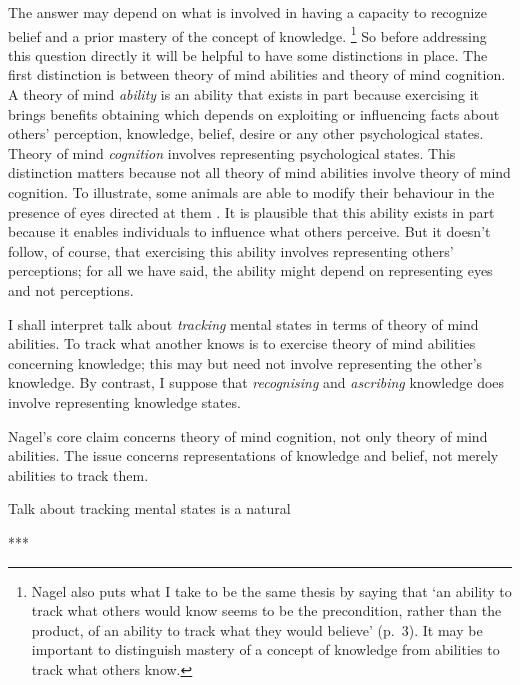 \documentclass[11pt,a4paper]{extarticle}
\begin{document}
The answer may depend on what is involved in having a capacity  to recognize belief and a prior mastery of the concept of knowledge.%
\footnote{
Nagel also puts what I take to be the same thesis by saying that `an ability to track what others would know seems to be the precondition, rather than the product, of an ability to track what they would believe' (p.\ 3).
It may be important to distinguish mastery of a concept of knowledge from abilities to track what others know.
}
So before addressing this question directly it will be helpful to have some distinctions in place.
The first distinction is between theory of mind abilities and theory of mind cognition.
A theory of mind \textit{ability} is an ability that exists in part because exercising it brings benefits obtaining which depends on exploiting or influencing facts about others’ perception, knowledge, belief, desire or any other psychological states.  
Theory of mind \textit{cognition}  involves representing psychological states.
This distinction matters because not all theory of mind abilities involve theory of mind cognition.
To illustrate, some animals are able to modify their behaviour  in the presence of eyes directed at them \citep[e.g.][]{ernest-jones_effects_2011}.
It is plausible that this ability exists in part because it enables individuals to influence what others perceive.
But it doesn't follow, of course, that exercising this ability involves representing others' perceptions; for all we have said, the ability might depend on representing eyes and not perceptions.  



I shall interpret talk about \textit{tracking} mental states in terms of theory of mind abilities.
To track what another knows is to exercise theory of mind abilities concerning knowledge; this may but need not involve representing the other's knowledge.
By contrast, I suppose that \textit{recognising} and \textit{ascribing} knowledge does involve representing knowledge states.




Nagel's core claim concerns theory of mind cognition, not only theory of mind abilities. 
The issue concerns representations of knowledge and belief, not merely abilities to track them.%




Talk about tracking mental states is a natural 

***
\end{document}
